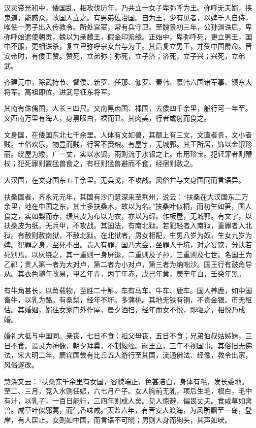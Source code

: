 \documentclass[12pt,UTF8]{ctexbook}
\begin{document}
汉灵帝光和中，倭国乱，相攻伐历年，乃共立一女子卑弥呼为王。弥呼无夫婿，挟鬼道，能惑众，故国人立之。有男弟佐治国。自为王，少有见者，以婢千人自侍，唯使一男子出入传教令。所处宫室，常有兵守卫。至魏景初三年，公孙渊诛后，卑弥呼始遣使朝贡，魏以为亲魏王，假金印紫绶。正始中，卑弥呼死，更立男王，国中不服，更相诛杀，复立卑弥呼宗女台与为王。其后复立男王，并受中国爵命。晋安帝时，有倭王赞。赞死，立弟弥；弥死，立子济；济死，立子兴；兴死，立弟武。

齐建元中，除武持节、督倭、新罗、任那、伽罗、秦韩、慕韩六国诸军事、镇东大将军。高祖即位，进武号征东将军。

其南有侏儒国，人长三四尺。又南黑齿国、裸国，去倭四千余里，船行可一年至。又西南万里有海人，身黑眼白，裸而丑。其肉美，行者或射而食之。

文身国，在倭国东北七千余里。人体有文如兽，其额上有三文，文直者贵，文小者贱。土俗欢乐，物豊而贱，行客不赍粮。有屋宇，无城郭。其王所居，饰以金银珍丽。绕屋为緌，广一丈，实以水银，雨则流于水银之上。市用珍宝。犯轻罪者则鞭杖；犯死罪则置猛兽食之，有枉则猛兽避而不食，经宿则赦之。

大汉国，在文身国东五千余里。无兵戈，不攻战。风俗并与文身国同而言语异。

扶桑国者，齐永元元年，其国有沙门慧深来至荆州，说云：“扶桑在大汉国东二万余里，地在中国之东，其土多扶桑木，故以为名。”扶桑叶似桐，而初生如笋，国人食之，实如梨而赤，绩其皮为布以为衣，亦以为绵。作板屋，无城郭。有文字，以扶桑皮为纸。无兵甲，不攻战。其国法，有南北狱。若犯轻者入南狱，重罪者入北狱。有赦则赦南狱，不赦北狱。在北狱者，男女相配，生男八岁为奴，生女九岁为婢。犯罪之身，至死不出。贵人有罪，国乃大会，坐罪人于坑，对之宴饮，分诀若死别焉。以灰绕之，其一重则一身屏退，二重则及子孙，三重则及七世。名国王为乙祁；贵人第一者为大对卢，第二者为小对卢，第三者为纳咄沙。国王行有鼓角导从。其衣色随年改易，甲乙年青，丙丁年赤，戊己年黄，庚辛年白，壬癸年黑。

有牛角甚长，以角载物，至胜二十斛。车有马车、牛车、鹿车。国人养鹿，如中国畜牛，以乳为酪。有桑梨，经年不坏。多蒲桃。其地无铁有铜，不贵金银。市无租估。其婚姻，婿往女家门外作屋，晨夕洒扫，经年而女不悦，即驱之，相悦乃成婚。

婚礼大抵与中国同。亲丧，七日不食；祖父母丧，五日不食；兄弟伯叔姑姊妹，三日不食。设灵为神像，朝夕拜奠，不制縗绖。嗣王立，三年不视国事。其俗旧无佛法，宋大明二年，罽宾国尝有比丘五人游行至其国，流通佛法、经像，教令出家，风俗遂改。

慧深又云：“扶桑东千余里有女国，容貌端正，色甚洁白，身体有毛，发长委地。至二、三月，竞入水则任娠，六七月产子。女人胸前无乳，项后生毛，根白，毛中有汁，以乳子，一百日能行，三四年则成人矣。见人惊避，偏畏丈夫。食咸草如禽兽。咸草叶似邪蒿，而气香味咸。”天监六年，有晋安人渡海，为风所飘至一岛，登岸，有人居止。女则如中国，而言语不可晓；男则人身而狗头，其声如吠。
\end{document}
